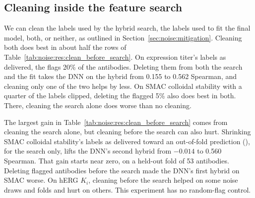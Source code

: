 \subsection{Cleaning inside the feature search}\label{sec:noise:res:search}

We can clean the labels used by the hybrid search, the labels used to fit the final model, both, or neither, as outlined in Section~\ref{sec:noise:mitigation}. Cleaning both does best in about half the rows of Table~\ref{tab:noise:res:clean_before_search}. On expression titer's labels as delivered, the  flags 20\% of the antibodies. Deleting them from both the search and the fit takes the DNN on the hybrid from 0.155 to 0.562 Spearman, and cleaning only one of the two helps by less. On SMAC colloidal stability with a quarter of the labels clipped, deleting the flagged 5\% also does best in both. There, cleaning the search alone does worse than no cleaning.

The largest gain in Table~\ref{tab:noise:res:clean_before_search} comes from cleaning the search alone, but cleaning before the search can also hurt. Shrinking SMAC colloidal stability's labels as delivered toward an out-of-fold prediction (), for the search only, lifts the DNN's second hybrid from $-0.014$ to 0.560 Spearman. That gain starts near zero, on a held-out fold of 53 antibodies. Deleting flagged antibodies before the search made the DNN's first hybrid on SMAC worse. On hERG $K_i$, cleaning before the search helped on some noise draws and folds and hurt on others. This experiment has no random-flag control.

